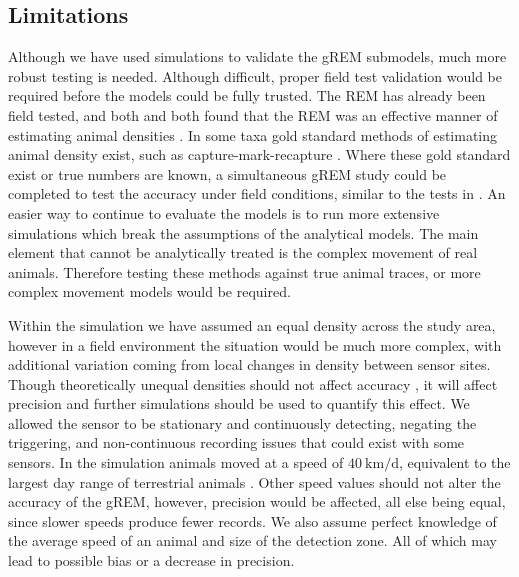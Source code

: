 \documentclass[a4paper,10pt,reqno,oneside]{amsart}
\begin{document}
\subsection*{Limitations}
Although we have used simulations to validate the gREM submodels, much more robust testing is needed. Although difficult, proper field test validation would be required before the models could be fully trusted.  The REM \citep{rowcliffe2008estimating} has already been field tested, and both \citet{rowcliffe2008estimating} and \citet{zero2013monitoring} both found that the REM was an effective manner of estimating animal densities \citep{rowcliffe2008estimating, zero2013monitoring}. In some taxa gold standard methods of estimating animal density exist, such as capture-mark-recapture \citep{sollmann2013using}. Where these gold standard exist or true numbers are known, a simultaneous gREM study could be completed to test the accuracy under field conditions, similar to the tests in \citet{rowcliffe2008estimating}. An easier way to continue to evaluate the models is to run more extensive simulations which break the assumptions of the analytical models. The main element that cannot be analytically treated is the complex movement of real animals. Therefore testing these methods against true animal traces, or more complex movement models would be required.

Within the simulation we have assumed an equal density across the study area, however in a field environment the situation would be much more complex, with additional variation coming from local changes in density between sensor sites. Though theoretically unequal densities should not affect accuracy \citep{Hutchinson_Waser_2007}, it will affect precision and further simulations should be used to quantify this effect. We allowed the sensor to be stationary and continuously detecting, negating the triggering, and non-continuous recording issues that could exist with some sensors. In the simulation animals moved at a speed of $\SI{40}{\kilo\meter \per \day}$, equivalent to the largest day range of terrestrial animals \citep{carbone2005far}. Other speed values should not alter the accuracy of the gREM, however, precision would be affected, all else being equal, since slower speeds produce fewer records. We also assume perfect knowledge of the average speed of an animal and size of the detection zone. All of which may lead to possible bias or a decrease in precision. 
\end{document}

